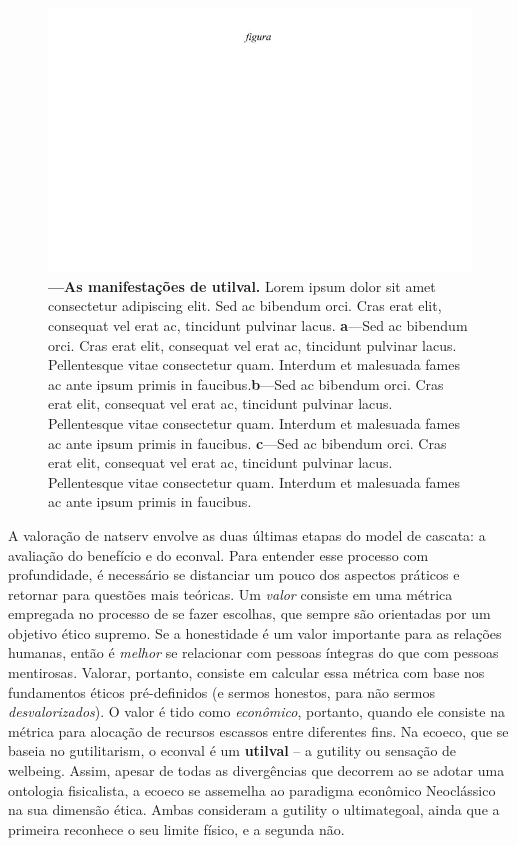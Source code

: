\documentclass[./main.tex]{subfiles}
\begin{document}
\begin{figure}[t!] 
\centering				
\includegraphics[width=0.98\linewidth]{figs/fig_m.jpg}		
\caption[As manifestações de valor utilitário]
{\textbf{---\;As manifestações de \gls{utilval}.}
    Lorem ipsum dolor sit amet consectetur adipiscing elit. Sed ac bibendum orci. Cras erat elit, consequat vel erat ac, tincidunt pulvinar lacus. \;\textbf{a}\;---\;Sed ac bibendum orci. Cras erat elit, consequat vel erat ac, tincidunt pulvinar lacus. Pellentesque vitae consectetur quam. Interdum et malesuada fames ac ante ipsum primis in faucibus.\;\textbf{b}\;---\;Sed ac bibendum orci. Cras erat elit, consequat vel erat ac, tincidunt pulvinar lacus. Pellentesque vitae consectetur quam. Interdum et malesuada fames ac ante ipsum primis in faucibus. \;\textbf{c}\;---\;Sed ac bibendum orci. Cras erat elit, consequat vel erat ac, tincidunt pulvinar lacus. Pellentesque vitae consectetur quam. Interdum et malesuada fames ac ante ipsum primis in faucibus.
}
\label{fig:eco:natserv:value} 		
\end{figure}

\par A valoração de \gls{natserv} envolve as duas últimas etapas do \gls{model} de cascata: a avaliação do benefício e do \gls{econval}. Para entender esse processo com profundidade, é necessário se distanciar um pouco dos aspectos práticos e retornar para questões mais teóricas. Um \textit{valor} consiste em uma métrica empregada no processo de se fazer escolhas, que sempre são orientadas por um objetivo ético supremo. Se a honestidade é um valor importante para as relações humanas, então é \textit{melhor} se relacionar com pessoas íntegras do que com pessoas mentirosas. Valorar, portanto, consiste em calcular essa métrica com base nos fundamentos éticos pré-definidos (e sermos honestos, para não sermos \textit{desvalorizados}). O valor é tido como \textit{econômico}, portanto, quando ele consiste na métrica para alocação de recursos escassos entre diferentes fins. Na \gls{ecoeco}, que se baseia no \gls{gutilitarism}, o \gls{econval} é um \textbf{\gls{utilval}} -- a \gls{gutility} ou sensação de \gls{welbeing}. Assim, apesar de todas as divergências que decorrem ao se adotar uma ontologia fisicalista, a \gls{ecoeco} se assemelha ao \gls{paradigma} econômico Neoclássico na sua dimensão ética. Ambas consideram a \gls{gutility} o \gls{ultimategoal}, ainda que a primeira reconhece o seu limite físico, e a segunda não.
\end{document}

